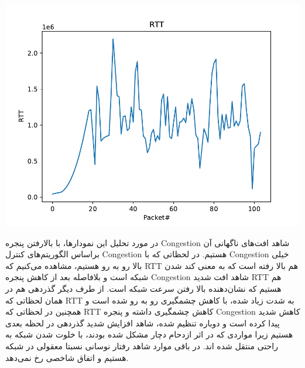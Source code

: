 \documentclass[12pt]{article}
\begin{document}
\begin{enumerate}
	\begin{center}
		\includegraphics[page=3, width = 0.6 \textwidth]{images/plots.pdf}
	\end{center}
	
\end{enumerate}

در مورد تحلیل این نمودارها، با بالارفتن پنجره Congestion شاهد افت‌های ناگهانی آن براساس الگوریتم‌های کنترل Congestion هستیم. در لحظاتی که با Congestion خیلی بالا رو به رو هستیم، مشاهده می‌کنیم که RTT هم بالا رفته است که به معنی کند شدن شبکه است و بلافاصله بعد از کاهش پنجره Congestion شاهد افت شدید RTT هم هستیم که نشان‌دهنده بالا رفتن سرعت شبکه است. از طرف دیگر گذردهی هم در همان لحظاتی که RTT به شدت زیاد شده، با کاهش چشمگیری رو به رو شده است و همچنین در لحظاتی که RTT کاهش چشمگیری داشته و پنجره Congestion کاهش شدید پیدا کرده است و دوباره تنظیم شده، شاهد افزایش شدید  گذردهی در لحظه بعدی هستیم زیرا مواردی که در اثر ازدحام دچار مشکل شده بودند، با خلوت شدن شبکه به راحتی منتقل شده اند. در باقی موارد شاهد رفتار نوسانی نسبتا معقولی در شبکه هستیم و اتفاق شاخصی رخ نمی‌دهد.
\end{document}
